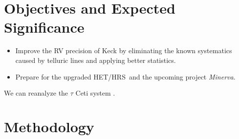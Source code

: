 \documentclass[12pt]{article}
\def\minerva{{\it Minerva}}
\def\hrs{HET/HRS}
\begin{document}

\section{Objectives and Expected Significance}









\begin{itemize}[leftmargin=2.2em]
    \vspace{-3pt}
\item Improve the RV precision of Keck by eliminating the known
  systematics caused by telluric lines and applying better statistics.
    \vspace{-3pt}
\end{itemize}


\begin{itemize}[leftmargin=2.2em]
  \vspace{-3pt}
\item Prepare for the upgraded \hrs\ and the upcoming project \minerva.
  \vspace{-3pt}
\end{itemize}


We can reanalyze the $\tau$ Ceti system \citep{tuomi2013}.





\vspace{-3pt}
\section{Methodology}


\vspace{-3pt}
\end{document}
